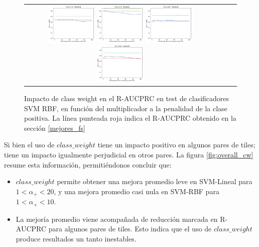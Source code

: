 \begin{figure}[h!]
\begin{tabular}{cccc}
\includegraphics[width=0.25\textwidth]{Kap7/cw/train=b278_test=b234_rbf_individual_curves.png}  \includegraphics[width=0.25\textwidth]{Kap7/cw/train=b278_test=b261_rbf_individual_curves.png} 
 \includegraphics[width=0.25\textwidth]{Kap7/cw/train=b360_test=b234_rbf_individual_curves.png}  \includegraphics[width=0.25\textwidth]{Kap7/cw/train=b360_test=b278_rbf_individual_curves.png} 
\end{tabular}
\caption{Impacto de class weight en el R-AUCPRC en test de clasificadores SVM RBF, en función del multiplicador a la penalidad de la clase positiva. La línea punteada roja indica el R-AUCPRC obtenido en la sección \protect\ref{mejores_fs}}
\label{fig:cw_k}
\end{figure}

Si bien el uso de $class\_weight$ tiene un impacto  positivo en algunos pares de tiles; tiene un impacto igualmente perjudicial en otros pares. La figura \ref{fig:overall_cw} resume esta información, permitiéndonos concluir que:

\begin{itemize}
\item $class\_weight$ permite obtener una mejora promedio leve en SVM-Lineal para $ 1 < \alpha_+ < 20$, y una mejora promedio casi nula en SVM-RBF para $1 < \alpha_+ < 10$.
\item La mejoría promedio viene acompañada de reducción marcada en R-AUCPRC para algunos pares de tiles. Esto indica que el uso de $class\_weight$ produce resultados un tanto inestables.
\end{itemize}


